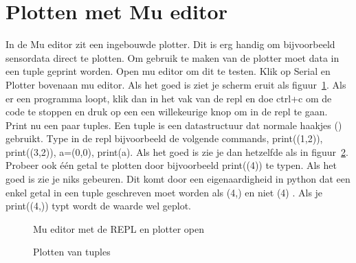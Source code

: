 \section{Plotten met Mu editor}\label{sec:plotter}
In de Mu editor zit een ingebouwde plotter. Dit is erg handig om bijvoorbeeld sensordata direct te plotten. Om gebruik te maken van de plotter moet data in een tuple geprint worden. Open mu editor om dit te testen. Klik op Serial en Plotter bovenaan mu editor. Als het goed is ziet je scherm eruit als figuur~\ref{fig:SerialPlotter}. Als er een programma loopt, klik dan in het vak van de repl en doe ctrl+c om de code te stoppen en druk op een een willekeurige knop om in de repl te gaan. Print nu een paar tuples. Een tuple is een datastructuur dat normale haakjes () gebruikt. Type in de repl bijvoorbeeld de volgende commands, print((1,2)), print((3,2)), a=(0,0), print(a). Als het goed is zie je dan hetzelfde als in figuur~\ref{fig:TuplePlot}. Probeer ook \'e\'en getal te plotten door bijvoorbeeld print((4)) te typen. Als het goed is zie je niks gebeuren. Dit komt door een eigenaardigheid in python dat een enkel getal in een tuple geschreven moet worden als (4,) en niet (4) . Als je print((4,)) typt wordt de waarde wel geplot.

\begin{figure}[H]
	\caption{Mu editor met de REPL en plotter open}
	\label{fig:SerialPlotter}
\end{figure}

\begin{figure}[H]
	\caption{Plotten van tuples}
	\label{fig:TuplePlot}
\end{figure}


